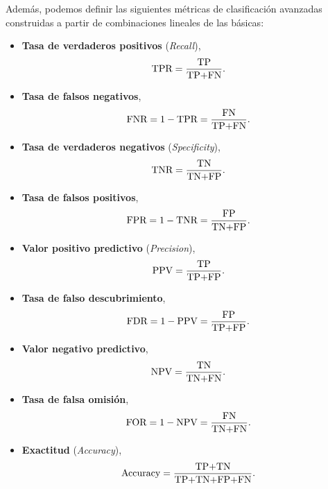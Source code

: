 \documentclass[oneside,openright,titlepage,numbers=noenddot,openany,headinclude,footinclude=true,
cleardoublepage=empty,abstractoff,BCOR=5mm,paper=a4,fontsize=12pt,main=spanish]{scrreprt}
\begin{document}
Además, podemos definir las siguientes métricas de clasificación avanzadas construidas a partir de combinaciones lineales de las básicas:\\

\begin{itemize}
    \item \textbf{Tasa de verdaderos positivos} (\textit{Recall}), $$\text{TPR}=\frac{\displaystyle \text{TP}}{\displaystyle \text{TP+FN}}.$$
    \item \textbf{Tasa de falsos negativos}, $$\text{FNR}=1-\text{TPR}=\frac{\displaystyle \text{FN}}{\displaystyle \text{TP+FN}}.$$
\end{itemize}

\clearpage

\begin{itemize}
    \item \textbf{Tasa de verdaderos negativos} (\textit{Specificity}), $$\text{TNR}=\frac{\displaystyle \text{TN}}{\displaystyle \text{TN+FP}}.$$
    \item \textbf{Tasa de falsos positivos}, $$\text{FPR}=1-\text{TNR}=\frac{\displaystyle \text{FP}}{\displaystyle \text{TN+FP}}.$$
    \item \textbf{Valor positivo predictivo} (\textit{Precision}),  $$\text{PPV}=\frac{\displaystyle \text{TP}}{\displaystyle \text{TP+FP}}.$$
    \item \textbf{Tasa de falso descubrimiento}, $$\text{FDR}=1-\text{PPV}=\frac{\displaystyle \text{FP}}{\displaystyle \text{TP+FP}}.$$
    \item \textbf{Valor negativo predictivo}, $$\text{NPV}=\frac{\displaystyle \text{TN}}{\displaystyle \text{TN+FN}}.$$
    \item \textbf{Tasa de falsa omisión}, $$\text{FOR}=1-\text{NPV}=\frac{\displaystyle \text{FN}}{\displaystyle \text{TN+FN}}.$$
    \item \textbf{Exactitud} (\textit{Accuracy}), $$\text{Accuracy}=\frac{\displaystyle \text{TP+TN}}{\displaystyle \text{TP+TN+FP+FN}}.$$
\end{itemize}\
\end{document}
